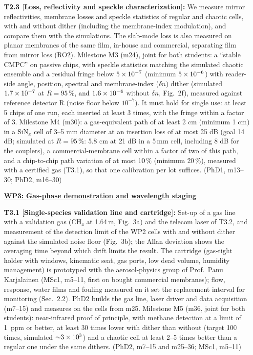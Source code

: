 \documentclass[a4paper,12pt]{article}
\newcommand{\wc}[1]{\textcolor{dkmaroon}{#1}} %
\newcommand{\jc}[1]{\textcolor{dkrust}{#1}} %
\renewcommand{\times}{\mathbin{\text{\texttimes}}}%
\begin{document}
\textbf{T2.3 [Loss, reflectivity and speckle characterization]:} \jc{We measure mirror reflectivities, membrane losses and speckle statistics of regular and chaotic cells, with and without dither (including the membrane-index modulation), and compare them with the simulations. The slab-mode loss is also measured on planar membranes of the same film, in-house and commercial, separating film from mirror loss (RO2). Milestone M3 (m24), joint for both students: a ``stable CMPC'' on passive chips, with speckle statistics matching the simulated chaotic ensemble and a residual fringe below $5\times10^{-7}$ (minimum $5\times10^{-6}$) with reader-side angle, position, spectral and membrane-index ($\delta n$) dither (simulated \wc{$1.7\times10^{-7}$ at $R=95\,\%$}, and $1.6\times10^{-6}$ without $\delta n$, Fig.~2f), measured against reference detector R (noise floor below $10^{-7}$). It must hold for single use: at least 5 chips of one run, each inserted at least 3 times, with the fringe within a factor of 3. Milestone M4 (m30): a gas-equivalent path of at least 2 cm (minimum 1 cm) in a SiN$_x$ cell of 3--5 mm diameter at an insertion loss of at most 25 dB (goal 14 dB\wc{; simulated at $R=95\,\%$: 5.8 cm at 21 dB in a 5\,mm cell, including 8 dB for the couplers}), a commercial-membrane cell within a factor of two of this path, and a chip-to-chip path variation of at most 10\,\% (minimum 20\,\%), measured with a certified gas (T3.1), so that one calibration per lot suffices.} (PhD1, m13--30; PhD2, m16--30)

\underline{\textbf{WP3: Gas-phase demonstration and wavelength staging}}

\textbf{T3.1 [Single-species validation line and cartridge]:} \jc{Set-up of a gas line with a validation gas (CH$_4$ at 1.64\,\textmu{}m, Fig.~3a) and the telecom laser of T3.2, and measurement of the detection limit of the WP2 cells with and without dither against the simulated noise floor (Fig.~3b); the Allan deviation shows the averaging time beyond which drift limits the result. The cartridge (gas-tight holder with windows, kinematic seat, gas ports, low dead volume, humidity management) is prototyped with the aerosol-physics group of Prof.~Panu Karjalainen (MSc1, m5--11, first on bought commercial membranes); flow, response, water films and fouling measured on it set the replacement interval for monitoring (Sec.~2.2). PhD2 builds the gas line, laser driver and data acquisition (m7--15) and measures on the cells from m25. Milestone M5 (m36, joint for both students): near-infrared proof of principle, with methane detection at a limit of 1~ppm or better, at least 30 times lower with dither than without (target 100 times, simulated ${\sim}3\times10^3$) and a chaotic cell at least 2--5 times better than a regular one under the same dithers.} (PhD2, m7--15 and m25--36; MSc1, m5--11)
\end{document}
